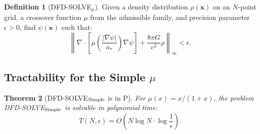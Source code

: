 \documentclass[11pt]{article}
\newtheorem{theorem}{Theorem}[section]
\theoremstyle{definition}
\newtheorem{definition}[theorem]{Definition}
\theoremstyle{remark}
\begin{document}
\begin{definition}[DFD-SOLVE$_\mu$]
\label{def:dfd-solve}
Given a density distribution $\rho(\mathbf{x})$ on an $N$-point grid, a
crossover function $\mu$ from the admissible family, and precision
parameter $\epsilon > 0$, find $\psi(\mathbf{x})$ such that:
\begin{equation}
  \left\|\nabla \cdot \left[\mu\!\left(\frac{|\nabla\psi|}{a_*}\right)
  \nabla\psi\right] + \frac{8\pi G}{c^2}\rho\right\|_\infty < \epsilon.
  \label{eq:dfd-solve}
\end{equation}
\end{definition}

\subsection{Tractability for the Simple $\mu$}
\label{sec:simple-mu-tractability}

\begin{theorem}[DFD-SOLVE$_{\rm Simple}$ is in P]
\label{thm:simple-in-p}
For $\mu(x) = x/(1+x)$, the problem DFD-SOLVE$_{\rm Simple}$ is solvable
in polynomial time:
\begin{equation}
  T(N, \epsilon) = O\!\left(N \log N \cdot \log\frac{1}{\epsilon}\right).
  \label{eq:complexity-simple}
\end{equation}
\end{theorem}
\end{document}

